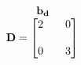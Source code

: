 \documentclass[preview]{standalone}
\begin{document}
\begin{align*}
\begin{array}{c}\begin{matrix}\hspace{1cm} \mathbf{b_d}  \quad \hspace{0.6cm} \end{matrix} \\  \mathbf{D} = \begin{bmatrix} 2 & \quad 0 \\ \\0 & \quad 3 \end{bmatrix} \end{array}
\end{align*}
\end{document}

